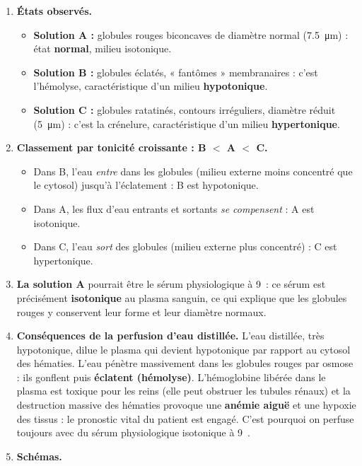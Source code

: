 \documentclass[11pt]{article}
\newcommand{\cle}[1]{{\popxbold\color{popdark}#1}}
\begin{document}
\begin{corrige}
\begin{enumerate}
\item \textbf{États observés.}
\begin{itemize}
\item \textbf{Solution A :} globules rouges biconcaves de diamètre normal (\SI{7,5}{\micro m}) : état \textbf{normal}, milieu isotonique.
\item \textbf{Solution B :} globules éclatés, « fantômes » membranaires : c'est l'\cle{hémolyse}, caractéristique d'un milieu \textbf{hypotonique}.
\item \textbf{Solution C :} globules ratatinés, contours irréguliers, diamètre réduit (\SI{5}{\micro m}) : c'est la \cle{crénelure}, caractéristique d'un milieu \textbf{hypertonique}.
\end{itemize}
\item \textbf{Classement par tonicité croissante : B $<$ A $<$ C.}
\begin{itemize}
\item Dans B, l'eau \emph{entre} dans les globules (milieu externe moins concentré que le cytosol) jusqu'à l'éclatement : B est hypotonique.
\item Dans A, les flux d'eau entrants et sortants \emph{se compensent} : A est isotonique.
\item Dans C, l'eau \emph{sort} des globules (milieu externe plus concentré) : C est hypertonique.
\end{itemize}
\item \textbf{La solution A} pourrait être le sérum physiologique à 9~\textperthousand : ce sérum est précisément \textbf{isotonique} au plasma sanguin, ce qui explique que les globules rouges y conservent leur forme et leur diamètre normaux.
\item \textbf{Conséquences de la perfusion d'eau distillée.} L'eau distillée, très hypotonique, dilue le plasma qui devient hypotonique par rapport au cytosol des hématies. L'eau pénètre massivement dans les globules rouges par osmose : ils gonflent puis \textbf{éclatent (hémolyse)}. L'hémoglobine libérée dans le plasma est toxique pour les reins (elle peut obstruer les tubules rénaux) et la destruction massive des hématies provoque une \textbf{anémie aiguë} et une hypoxie des tissus : le pronostic vital du patient est engagé. C'est pourquoi on perfuse toujours avec du sérum physiologique isotonique à 9~\textperthousand.
\item \textbf{Schémas.}

\end{enumerate}
\end{corrige}
\end{document}
